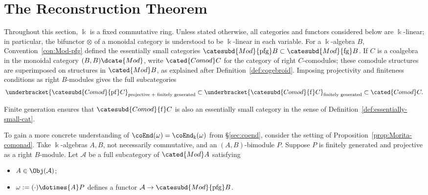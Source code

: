 
\section{The Reconstruction Theorem}\label{sec:Tannaka-coend}
\hypertarget{o014.aljabr2.chapter9.reconstruction-a}{ }
Throughout this section, $\Bbbk$ is a fixed commutative ring. Unless stated
otherwise, all categories and functors considered below are $\Bbbk$-linear;
in particular, the bifunctor $\otimes$ of a monoidal category is understood
to be $\Bbbk$-linear in each variable. For a $\Bbbk$-algebra $B$,
Convention~\ref{con:Mod-pfg} defined the essentially small categories
$\catesubd{Mod}{\mathrm{pfg}}B\subset
\catesubd{Mod}{\mathrm{fg}}B$. If $C$ is a coalgebra in the monoidal
category $(B,B)\dcate{Mod}$, write $\cated{Comod}C$ for the category of right
$C$-comodules; these comodule structures are superimposed on structures in
$\cated{Mod}B$, as explained after Definition~\ref{def:cogebroid}.
Imposing projectivity and finiteness conditions as right $B$-modules gives
the full subcategories
\[ \underbracket{\catesubd{Comod}{\mathrm{pf}}C}_{\text{projective + finitely generated}} \subset \underbracket{\catesubd{Comod}{\mathrm{f}}C}_{\text{finitely generated}} \subset \cated{Comod}C. \]

Finite generation ensures that $\catesubd{Comod}{\mathrm f}C$ is also an
essentially small category in the sense of
Definition~\ref{def:essentially-small-cat}.

To gain a more concrete understanding of
$\coEnd(\omega)=\coEnd_{\Bbbk}(\omega)$ from \S\ref{sec:coend}, consider
the setting of Proposition~\ref{prop:Morita-comonad}. Take $\Bbbk$-algebras
$A,B$, not necessarily commutative, and an $(A,B)$-bimodule $P$. Suppose
$P$ is finitely generated and projective as a right $B$-module. Let
$\mathcal{A}$ be a full subcategory of $\cated{Mod}A$ satisfying
\begin{itemize}
	\item $A\in\Obj(\mathcal{A})$;
	\item $\omega:=(\mathord\cdot)\dotimes{A}P$ defines a functor
	$\mathcal{A}\to\catesubd{Mod}{\mathrm{pfg}}B$.
\end{itemize}

